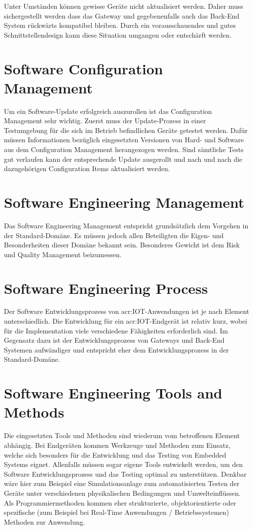 Unter Umständen können gewisse Geräte nicht aktualisiert werden. Daher muss sichergestellt werden dass das Gateway und gegebenenfalls auch das Back-End System rückwärts kompatibel bleiben. Durch ein vorausschauendes und gutes Schnittstellendesign kann diese Situation umgangen oder entschärft werden.



\section{Software Configuration Management}
Um ein Software-Update erfolgreich auszurollen ist das Configuration Management sehr wichtig. Zuerst muss der Update-Prozess in einer Testumgebung für die sich im Betrieb befindlichen Geräte getestet werden. Dafür müssen Informationen bezüglich eingesetzten Versionen von Hard- und Software aus dem Configuration Management herangezogen werden. Sind sämtliche Tests gut verlaufen kann der entsprechende Update ausgerollt und nach und nach die dazugehörigen Configuration Items aktualisiert werden.



\section{Software Engineering Management}
Das Software Engineering Management entspricht grundsätzlich dem Vorgehen in der Standard-Domäne. Es müssen jedoch allen Beteiligten die Eigen- und Besonderheiten dieser Domäne bekannt sein. Besonderes Gewicht ist dem Risk und Quality Management beizumessen.



\section{Software Engineering Process}
Der Software Entwicklungsprozess von \gls{acr:IOT}-Anwendungen ist je nach Element unterschiedlich. Die Entwicklung für ein \gls{acr:IOT}-Endgerät ist relativ kurz, wobei für die Implementation viele verschiedene Fähigkeiten erforderlich sind. Im Gegensatz dazu ist der Entwicklungsprozess von Gateways und Back-End Systemen aufwändiger und entspricht eher dem Entwicklungsprozess in der Standard-Domäne.



\section{Software Engineering Tools and Methods}
Die eingesetzten Tools und Methoden sind wiederum vom betroffenen Element abhängig. Bei Endgeräten kommen Werkzeuge und Methoden zum Einsatz, welche sich besonders für die Entwicklung und das Testing von Embedded Systems eignet. Allenfalls müssen sogar eigene Tools entwickelt werden, um den Software Entwicklungsprozess und das Testing optimal zu unterstützen. Denkbar wäre hier zum Beispiel eine Simulationsanlage zum automatisierten Testen der Geräte unter verschiedenen physikalischen Bedingungen und Umwelteinflüssen. Als Programmiermethoden kommen eher strukturierte, objektorientierte oder spezifische (zum Beispiel bei Real-Time Anwendungen / Betriebssystemen) Methoden zur Anwendung.

